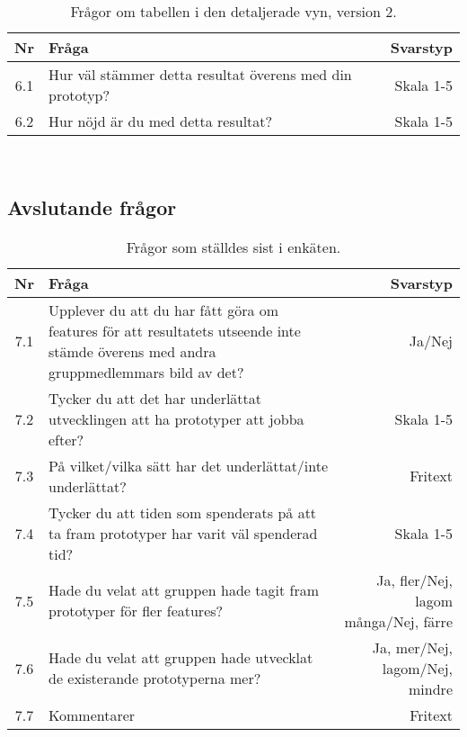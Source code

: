 \begin{table}[h!]
  \caption{Frågor om tabellen i den detaljerade vyn, version 2.}
  \def\arraystretch{1.5}
  \begin{adjustbox}{max width=\textwidth}
    \begin{tabularx}{\textwidth}{ | c | X | r |}
      \hline
      \textbf{Nr} & \textbf{Fråga} & \textbf{Svarstyp} \\
      \hline
      6.1 & Hur väl stämmer detta resultat överens med din prototyp? & Skala 1-5 \\
      \hline
      6.2 & Hur nöjd är du med detta resultat? & Skala 1-5 \\
      \hline 
    \end{tabularx}
  \end{adjustbox}
  \label{tab:prototyp_enkat_table_2}
\end{table}
\ 
\newpage
\subsection{Avslutande frågor}
\begin{table}[h!]
  \caption{Frågor som ställdes sist i enkäten.}
  \def\arraystretch{1.5}
  \begin{adjustbox}{max width=\textwidth}
    \begin{tabularx}{\textwidth}{ | c | X | r |}
      \hline
      \textbf{Nr} & \textbf{Fråga} & \textbf{Svarstyp} \\
      \hline
      7.1 & Upplever du att du har fått göra om features för att resultatets utseende inte stämde överens med andra gruppmedlemmars bild av det? & Ja/Nej \\
      \hline
      7.2 & Tycker du att det har underlättat utvecklingen att ha prototyper att jobba efter? & Skala 1-5 \\
      \hline 
      7.3 & På vilket/vilka sätt har det underlättat/inte underlättat? & Fritext \\
      \hline 
      7.4 & Tycker du att tiden som spenderats på att ta fram prototyper har varit väl spenderad tid? & Skala 1-5 \\
      \hline 
      7.5 & Hade du velat att gruppen hade tagit fram prototyper för fler features? & Ja, fler/Nej, lagom många/Nej, färre \\
      \hline 
      7.6 & Hade du velat att gruppen hade utvecklat de existerande prototyperna mer? & Ja, mer/Nej, lagom/Nej, mindre \\
      \hline 
      7.7 & Kommentarer & Fritext \\
      \hline  
    \end{tabularx}
  \end{adjustbox}
  \label{tab:prototyp_enkat_last_questions}
\end{table}
\ 

